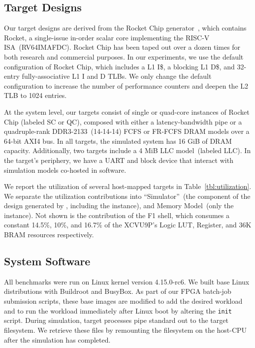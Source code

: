 \subsection{Target Designs}\label{sec:target-parameters} Our target designs
are derived from the Rocket Chip generator~\cite{rocketchip}, which contains
Rocket, a single-issue in-order scalar core implementing the RISC-V
ISA~(RV64IMAFDC). Rocket Chip
has been taped out over a dozen times for both research and commercial
purposes. In our
experiments, we use the default
configuration of Rocket Chip, which includes
a  L1 I\$, a blocking  L1 D\$, and 32-entry
fully-associative L1 I and D TLBs. We only change the default configuration to
increase the number of performance counters and deepen the L2 TLB to 1024 entries.

At the system level, our targets consist of single or quad-core instances
of Rocket Chip (labeled SC or QC), composed with either a latency-bandwidth pipe
or a quadruple-rank DDR3-2133~(14-14-14) FCFS or FR-FCFS
DRAM models over a 64-bit AXI4 bus. In all targets, the simulated system has
16 GiB of DRAM capacity. Additionally, two targets include a 4 MiB
LLC model~(labeled LLC). In the target's periphery, we have a UART and block
device that interact with simulation models co-hosted in software.

We report the utilization of several host-mapped targets in
Table~\ref{tbl:utilization}.  We separate the utilization contributions into ``Simulator''~(the
component of the design generated by \SIMNAME, including the \PNAME instance),
and Memory Model~(only the \PNAME instance). Not shown is the contribution of the
F1 shell, which consumes a constant 14.5\%, 10\%, and 16.7\%  of the XCVU9P's
Logic LUT, Register, and 36K BRAM resources respectively.

\vspace{-0.05in}
\subsection{System Software}

All benchmarks were run on Linux kernel version 4.15.0-rc6. We built base Linux
distributions with Buildroot and BusyBox. As part of our FPGA batch-job submission
scripts, these base images are modified to add the desired workload and to run
the workload immediately after Linux boot by altering the \texttt{init}
script. During simulation, target processes pipe standard out to the target
filesystem. We retrieve these files by remounting the filesystem on the
host-CPU after the simulation has completed.

